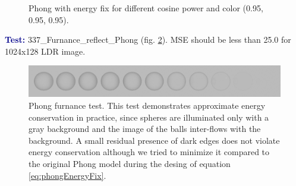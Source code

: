 \documentclass[12pt]{article}
\newcommand\boldblue[1]{\textcolor{darkblue}{\textbf{#1}}}
\begin{document}
\begin{figure}[h]
\begin{minipage}[h]{0.325\linewidth}
	\end{minipage}
	\begin{minipage}[h]{0.33\linewidth}
	\end{minipage}
	\caption{Phong with energy fix for different cosine power and color (0.95, 0.95, 0.95).}\label{fig:phong2}
\end{figure}

\boldblue{Test:} 337\_Furnance\_reflect\_Phong (fig. \ref{fig:test_337_image}). MSE should be less than 25.0 for 1024x128 LDR image.

\begin{figure}[htb]
	\centering
	\includegraphics[width=1.0\linewidth]{../../3dsMaxTests/Reference/337_Furnance_reflect_Phong.png}           
	\caption{\label{fig:test_337_image}
		Phong furnance test. This test demonstrates approximate energy conservation in practice, since spheres are illuminated only with a gray background and the image of the balls inter-flows with the background. A small residual presence of dark edges does not violate energy conservation although we tried to minimize it compared to the original Phong model during the desing of equation \ref{eq:phongEnergyFix}.  }   
\end{figure}
\end{document}
